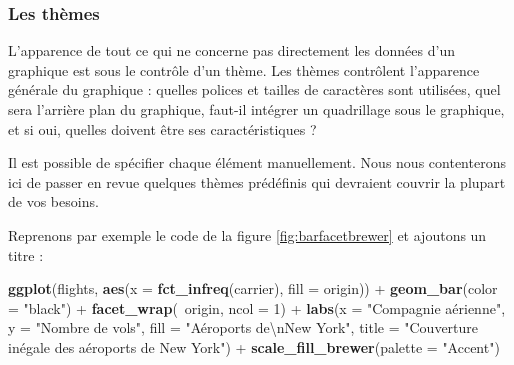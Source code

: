 \documentclass[
  a4paper,
]{article}
\newenvironment{Shaded}{\begin{snugshade}}{\end{snugshade}}
\newcommand{\CharTok}[1]{\textcolor[rgb]{0.57,0.30,0.62}{#1}}
\newcommand{\DataTypeTok}[1]{\textcolor[rgb]{0.00,0.34,0.68}{#1}}
\newcommand{\DecValTok}[1]{\textcolor[rgb]{0.69,0.50,0.00}{#1}}
\newcommand{\KeywordTok}[1]{\textcolor[rgb]{0.12,0.11,0.11}{\textbf{#1}}}
\newcommand{\NormalTok}[1]{\textcolor[rgb]{0.12,0.11,0.11}{#1}}
\newcommand{\OperatorTok}[1]{\textcolor[rgb]{0.12,0.11,0.11}{#1}}
\newcommand{\StringTok}[1]{\textcolor[rgb]{0.75,0.01,0.01}{#1}}
\begin{document}
\hypertarget{les-thuxe8mes}{%
\subsubsection{Les thèmes}\label{les-thuxe8mes}}

L'apparence de tout ce qui ne concerne pas directement les données d'un graphique est sous le contrôle d'un thème. Les thèmes contrôlent l'apparence générale du graphique : quelles polices et tailles de caractères sont utilisées, quel sera l'arrière plan du graphique, faut-il intégrer un quadrillage sous le graphique, et si oui, quelles doivent être ses caractéristiques ?

Il est possible de spécifier chaque élément manuellement. Nous nous contenterons ici de passer en revue quelques thèmes prédéfinis qui devraient couvrir la plupart de vos besoins.

Reprenons par exemple le code de la figure \ref{fig:barfacetbrewer} et ajoutons un titre :

\begin{Shaded}
\begin{Highlighting}[]
\KeywordTok{ggplot}\NormalTok{(flights, }\KeywordTok{aes}\NormalTok{(}\DataTypeTok{x =} \KeywordTok{fct_infreq}\NormalTok{(carrier), }\DataTypeTok{fill =}\NormalTok{ origin)) }\OperatorTok{+}
\StringTok{  }\KeywordTok{geom_bar}\NormalTok{(}\DataTypeTok{color =} \StringTok{"black"}\NormalTok{) }\OperatorTok{+}
\StringTok{  }\KeywordTok{facet_wrap}\NormalTok{(}\OperatorTok{~}\NormalTok{origin, }\DataTypeTok{ncol =} \DecValTok{1}\NormalTok{) }\OperatorTok{+}
\StringTok{  }\KeywordTok{labs}\NormalTok{(}\DataTypeTok{x =} \StringTok{"Compagnie aérienne"}\NormalTok{,}
       \DataTypeTok{y =} \StringTok{"Nombre de vols"}\NormalTok{,}
       \DataTypeTok{fill =} \StringTok{"Aéroports de}\CharTok{\textbackslash{}n}\StringTok{New York"}\NormalTok{,}
       \DataTypeTok{title =} \StringTok{"Couverture inégale des aéroports de New York"}\NormalTok{) }\OperatorTok{+}
\StringTok{  }\KeywordTok{scale_fill_brewer}\NormalTok{(}\DataTypeTok{palette =} \StringTok{"Accent"}\NormalTok{)}
\end{Highlighting}
\end{Shaded}
\end{document}
